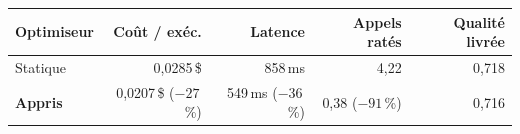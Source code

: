\begin{tabular}{lrrrr}
\toprule
\textbf{Optimiseur} & \textbf{Coût / exéc.} & \textbf{Latence} & \textbf{Appels ratés} & \textbf{Qualité livrée} \\
\midrule
Statique & 0,0285\,\$ & 858\,ms & 4,22 & 0,718 \\
\textbf{Appris} & 0,0207\,\$ ($-27$\,\%) & 549\,ms ($-36$\,\%) & 0,38 ($-91$\,\%) & 0,716 \\
\bottomrule
\end{tabular}
